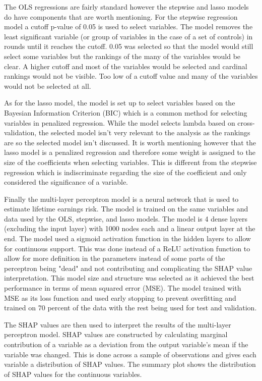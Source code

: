 \documentclass[12pt]{article}
\begin{document}
\begin{onehalfspace}
The OLS regressions are fairly standard however the stepwise and lasso models do have components that are worth mentioning. For the stepwise regression model a cutoff p-value of 0.05 is used to select variables. The model removes the least significant variable (or group of variables in the case of a set of controls) in rounds until it reaches the cutoff. 0.05 was selected so that the model would still select some variables but the rankings of the many of the variables would be clear. A higher cutoff and most of the variables would be selected and cardinal rankings would not be visible. Too low of a cutoff value and many of the variables would not be selected at all. 

As for the lasso model, the model is set up to select variables based on the Bayesian Information Criterion (BIC) which is a common method for selecting variables in penalized regression. While the model selects lambda based on cross-validation, the selected model isn't very relevant to the analysis as the rankings are so the selected model isn't discussed. It is worth mentioning however that the lasso model is a penalized regression and therefore some weight is assigned to the size of the coefficients when selecting variables. This is different from the stepwise regression which is indiscriminate regarding the size of the coefficient and only considered the significance of a variable.

Finally the multi-layer perceptron model is a neural network that is used to estimate lifetime earnings risk. The model is trained on the same variables and data used by the OLS, stepwise, and lasso models. The model is 4 dense layers (excluding the input layer) with 1000 nodes each and a linear output layer at the end. The model used a sigmoid activation function in the hidden layers to allow for continuous support. This was done instead of a ReLU activation function to allow for more definition in the parameters instead of some parts of the perceptron being "dead" and not contributing and complicating the SHAP value interpretation. This model size and structure was selected as it achieved the best performance in terms of mean squared error (MSE). The model trained with MSE as its loss function and used early stopping to prevent overfitting and trained on 70 percent of the data with the rest being used for test and validation.

The SHAP values are then used to interpret the results of the multi-layer perceptron model. SHAP values are constructed by calculating marginal contribution of a variable as a deviation from the output variable's mean if the variable was changed. This is done across a sample of observations and gives each variable a distribution of SHAP values. The summary plot shows the distribution of SHAP values for the continuous variables. 


\end{onehalfspace}
\end{document}

